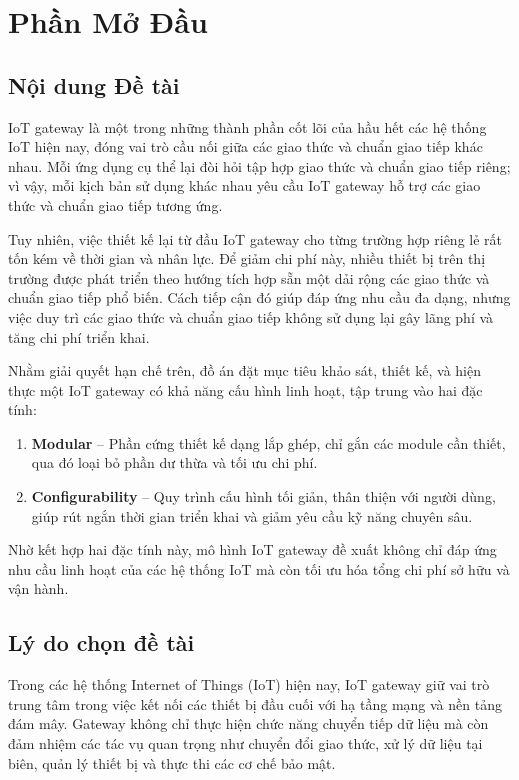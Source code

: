 \chapter{Phần Mở Đầu}\label{chap:phan_mo_dau}
    \section{Nội dung Đề tài}
        IoT gateway là một trong những thành phần cốt lõi của hầu hết các hệ thống IoT hiện nay, đóng vai trò cầu nối giữa các giao thức và chuẩn giao tiếp khác nhau. Mỗi ứng dụng cụ thể lại đòi hỏi tập hợp giao thức và chuẩn giao tiếp riêng; vì vậy, mỗi kịch bản sử dụng khác nhau yêu cầu IoT gateway hỗ trợ các giao thức và chuẩn giao tiếp tương ứng.\par

        Tuy nhiên, việc thiết kế lại từ đầu IoT gateway cho từng trường hợp riêng lẻ rất tốn kém về thời gian và nhân lực. Để giảm chi phí này, nhiều thiết bị trên thị trường được phát triển theo hướng tích hợp sẵn một dải rộng các giao thức và chuẩn giao tiếp phổ biến. Cách tiếp cận đó giúp đáp ứng nhu cầu đa dạng, nhưng việc duy trì các giao thức và chuẩn giao tiếp không sử dụng lại gây lãng phí và tăng chi phí triển khai.\par
        
        Nhằm giải quyết hạn chế trên, đồ án đặt mục tiêu khảo sát, thiết kế, và hiện thực một IoT gateway có khả năng cấu hình linh hoạt, tập trung vào hai đặc tính:\par
        \begin{enumerate}
            \item \textbf{Modular} – Phần cứng thiết kế dạng lắp ghép, chỉ gắn các module cần thiết, qua đó loại bỏ phần dư thừa và tối ưu chi phí.
            \item \textbf{Configurability} – Quy trình cấu hình tối giản, thân thiện với người dùng, giúp rút ngắn thời gian triển khai và giảm yêu cầu kỹ năng chuyên sâu.
        \end{enumerate}
        
        Nhờ kết hợp hai đặc tính này, mô hình IoT gateway đề xuất không chỉ đáp ứng nhu cầu linh hoạt của các hệ thống IoT mà còn tối ưu hóa tổng chi phí sở hữu và vận hành.

    \section{Lý do chọn đề tài}
        Trong các hệ thống Internet of Things (IoT) hiện nay, IoT gateway giữ vai trò trung tâm trong việc kết nối các thiết bị đầu cuối với hạ tầng mạng và nền tảng đám mây. Gateway không chỉ thực hiện chức năng chuyển tiếp dữ liệu mà còn đảm nhiệm các tác vụ quan trọng như chuyển đổi giao thức, xử lý dữ liệu tại biên, quản lý thiết bị và thực thi các cơ chế bảo mật.

